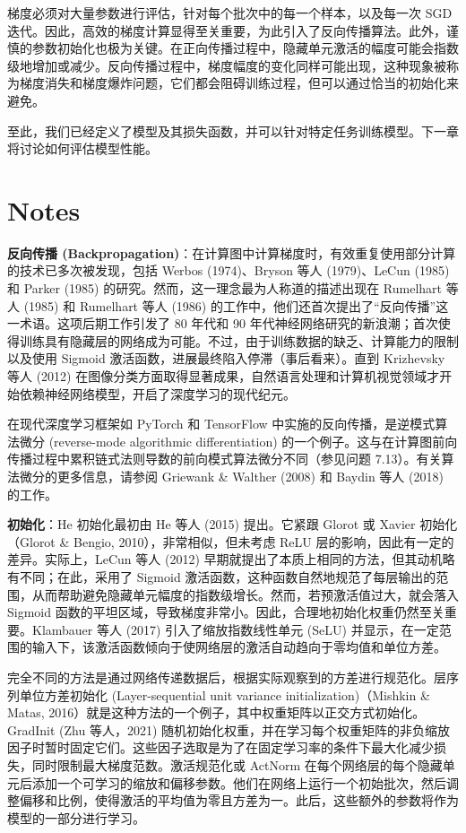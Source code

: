 梯度必须对大量参数进行评估，针对每个批次中的每一个样本，以及每一次 SGD 迭代。因此，高效的梯度计算显得至关重要，为此引入了反向传播算法。此外，谨慎的参数初始化也极为关键。在正向传播过程中，隐藏单元激活的幅度可能会指数级地增加或减少。反向传播过程中，梯度幅度的变化同样可能出现，这种现象被称为梯度消失和梯度爆炸问题，它们都会阻碍训练过程，但可以通过恰当的初始化来避免。

至此，我们已经定义了模型及其损失函数，并可以针对特定任务训练模型。下一章将讨论如何评估模型性能。
\section{Notes}
\textbf{反向传播 (Backpropagation)}：在计算图中计算梯度时，有效重复使用部分计算的技术已多次被发现，包括 Werbos (1974)、Bryson 等人 (1979)、LeCun (1985) 和 Parker (1985) 的研究。然而，这一理念最为人称道的描述出现在 Rumelhart 等人 (1985) 和 Rumelhart 等人 (1986) 的工作中，他们还首次提出了“反向传播”这一术语。这项后期工作引发了 80 年代和 90 年代神经网络研究的新浪潮；首次使得训练具有隐藏层的网络成为可能。不过，由于训练数据的缺乏、计算能力的限制以及使用 Sigmoid 激活函数，进展最终陷入停滞（事后看来）。直到 Krizhevsky 等人 (2012) 在图像分类方面取得显著成果，自然语言处理和计算机视觉领域才开始依赖神经网络模型，开启了深度学习的现代纪元。

在现代深度学习框架如 PyTorch 和 TensorFlow 中实施的反向传播，是逆模式算法微分 (reverse-mode algorithmic differentiation) 的一个例子。这与在计算图前向传播过程中累积链式法则导数的前向模式算法微分不同（参见问题 7.13）。有关算法微分的更多信息，请参阅 Griewank \& Walther (2008) 和 Baydin 等人 (2018) 的工作。

\textbf{初始化}：He 初始化最初由 He 等人 (2015) 提出。它紧跟 Glorot 或 Xavier 初始化（Glorot \& Bengio, 2010），非常相似，但未考虑 ReLU 层的影响，因此有一定的差异。实际上，LeCun 等人 (2012) 早期就提出了本质上相同的方法，但其动机略有不同；在此，采用了 Sigmoid 激活函数，这种函数自然地规范了每层输出的范围，从而帮助避免隐藏单元幅度的指数级增长。然而，若预激活值过大，就会落入 Sigmoid 函数的平坦区域，导致梯度非常小。因此，合理地初始化权重仍然至关重要。Klambauer 等人 (2017) 引入了缩放指数线性单元 (SeLU) 并显示，在一定范围的输入下，该激活函数倾向于使网络层的激活自动趋向于零均值和单位方差。

完全不同的方法是通过网络传递数据后，根据实际观察到的方差进行规范化。层序列单位方差初始化 (Layer-sequential unit variance initialization)（Mishkin \& Matas, 2016）就是这种方法的一个例子，其中权重矩阵以正交方式初始化。GradInit (Zhu 等人，2021) 随机初始化权重，并在学习每个权重矩阵的非负缩放因子时暂时固定它们。这些因子选取是为了在固定学习率的条件下最大化减少损失，同时限制最大梯度范数。激活规范化或 ActNorm 在每个网络层的每个隐藏单元后添加一个可学习的缩放和偏移参数。他们在网络上运行一个初始批次，然后调整偏移和比例，使得激活的平均值为零且方差为一。此后，这些额外的参数将作为模型的一部分进行学习。

